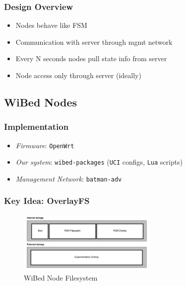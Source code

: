 \documentclass[usepdftitle=false,13pt]{beamer}
\begin{document}
\begin{frame}\frametitle{Design Overview}

	\begin{itemize}
		\item Nodes behave like FSM
		\item Communication with server through mgmt network
		\item Every N seconds nodes pull state info from server
		\item Node access only through server (ideally)
	\end{itemize}

\end{frame}


\subsection{WiBed Nodes}

\begin{frame}\frametitle{Implementation}

	\begin{itemize}
		\item \textit{Firmware}: \texttt{OpenWrt}
		\item \textit{Our system}: \texttt{wibed-packages} (\texttt{UCI} configs, \texttt{Lua} scripts)
		\item \textit{Management Network}: \texttt{batman-adv}
	\end{itemize}

\end{frame}

\begin{frame}\frametitle{Key Idea: OverlayFS}

\begin{figure}[h!]
\begin{center}
\includegraphics[width=0.6\textwidth]{pic/firmfs1}
\caption{WiBed Node Filesystem}
\label{fig:wmn}
\end{center}
\end{figure}

\end{frame}
\end{document}
